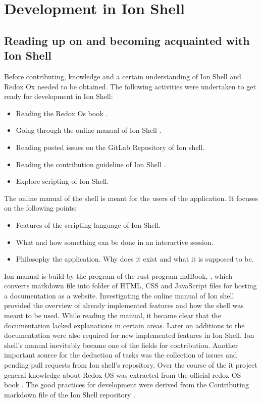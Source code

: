 \chapter{Development in Ion Shell}

\section{Reading up on and becoming acquainted with Ion Shell}

Before contributing, knowledge and a certain understanding of Ion Shell and Redox Ox needed to be obtained.
The following activities were undertaken to get ready for development in Ion Shell:

\begin{itemize}
	\item Reading the Redox Os book \cite{redox_os_book}.
	\item Going through the online manual of Ion Shell \cite{ion_manual_instroduction}.
	\item Reading posted issues on the GitLab Repository of Ion shell.
	\item Reading the contribution guideline of Ion Shell \cite{ion_shell_contributing}.
	\item Explore scripting of Ion Shell.
\end{itemize}

The online manual of the shell is meant for the users of the application.
It focuses on the following points:

\begin{itemize}
	\item Features of the scripting language of Ion Shell.
	\item What and how something can be done in an interactive session.
	\item Philosophy the application. Why does it exist and what it is supposed to be.
\end{itemize}

Ion manual is build by the program of the rust program mdBook, \cite{mdBook}, which converts markdown file into folder of
HTML, CSS and JavaScript files for hosting a documentation as a website.
Investigating the online manual of Ion shell provided the overview of already implemented features and
how the shell was meant to be used.
While reading the manual, it became clear that the documentation lacked explanations in certain areas.
Later on additions to the documentation were also required for new implemented features in Ion Shell.
Ion shell's manual inevitably became one of the fields for contribution.
Another important source for the deduction of tasks was the
collection of issues and pending pull requests from Ion shell's repository.
Over the course of the it project general knowledge
about Redox OS was extracted from the official redox OS book \cite{redox_os_book}.
The good practices for development were derived from the Contributing markdown file of the Ion Shell repository \cite{ion_shell_contributing}.

